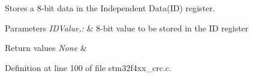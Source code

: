 Stores a 8-\/bit data in the Independent Data(\-I\-D) register. 


\begin{DoxyParams}{Parameters}
{\em I\-D\-Value,\-:} & 8-\/bit value to be stored in the I\-D register \\
\hline
\end{DoxyParams}

\begin{DoxyRetVals}{Return values}
{\em None} & \\
\hline
\end{DoxyRetVals}


Definition at line 100 of file stm32f4xx\-\_\-crc.\-c.

